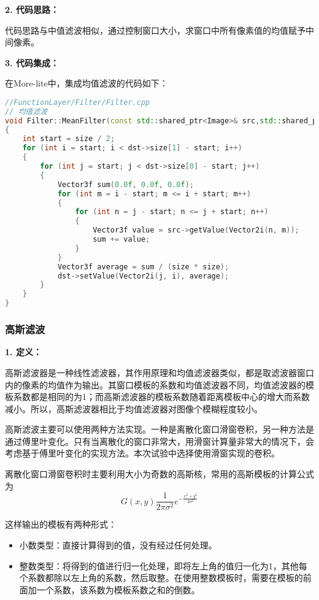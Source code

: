 \documentclass[lang=cn,10pt]{elegantbook}
\begin{document}
\textcolor{third}{\textbf{2. 代码思路：}}

代码思路与中值滤波相似，通过控制窗口大小，求窗口中所有像素值的均值赋予中间像素。

\textcolor{third}{\textbf{3. 代码集成：}}

在More-lite中，集成均值滤波的代码如下：
\begin{lstlisting}[language=c++]
//FunctionLayer/Filter/Filter.cpp
// 均值滤波
void Filter::MeanFilter(const std::shared_ptr<Image>& src,std::shared_ptr<Image>& dst, double size)
{
    int start = size / 2;
    for (int i = start; i < dst->size[1] - start; i++)
    {
        for (int j = start; j < dst->size[0] - start; j++)
        {
            Vector3f sum(0.0f, 0.0f, 0.0f);
            for (int m = i - start; m <= i + start; m++)
            {
                for (int n = j - start; n <= j + start; n++)
                {
                    Vector3f value = src->getValue(Vector2i(n, m));
                    sum += value;
                }
            }
            Vector3f average = sum / (size * size);
            dst->setValue(Vector2i(j, i), average);
        }
    } 
}
\end{lstlisting}



\subsubsection{高斯滤波}
\textcolor{third}{\textbf{1. 定义：}}

高斯滤波器是一种线性滤波器，其作用原理和均值滤波器类似，都是取滤波器窗口内的像素的均值作为输出。其窗口模板的系数和均值滤波器不同，均值滤波器的模板系数都是相同的为1；而高斯滤波器的模板系数随着距离模板中心的增大而系数减小。所以，高斯滤波器相比于均值滤波器对图像个模糊程度较小。

高斯滤波主要可以使用两种方法实现。一种是离散化窗口滑窗卷积，另一种方法是通过傅里叶变化。只有当离散化的窗口非常大，用滑窗计算量非常大的情况下，会考虑基于傅里叶变化的实现方法。本次试验中选择使用滑窗实现的卷积。

离散化窗口滑窗卷积时主要利用大小为奇数的高斯核，常用的高斯模板的计算公式为
\begin{equation}\label{eu_eqn}
G(x,y)\frac{1}{2\pi\sigma^2}e^{-\frac{x^2+y^2}{2\sigma^2}}
\end{equation}

这样输出的模板有两种形式：
\begin{itemize}
 \item 小数类型：直接计算得到的值，没有经过任何处理。

 \item 整数类型：将得到的值进行归一化处理，即将左上角的值归一化为1，其他每个系数都除以左上角的系数，然后取整。在使用整数模板时，需要在模板的前面加一个系数，该系数为模板系数之和的倒数。
\end{itemize}
\end{document}
